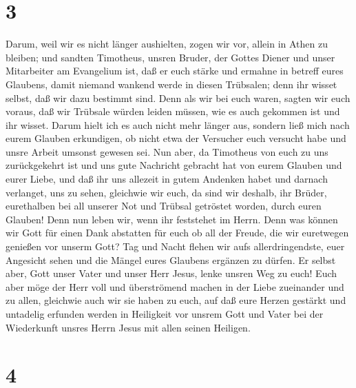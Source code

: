 \hypertarget{section-2}{%
\section{3}\label{section-2}}

 Darum, weil wir es nicht länger aushielten, zogen wir
vor, allein in Athen zu bleiben;  und sandten Timotheus,
unsren Bruder, der Gottes Diener und unser Mitarbeiter am Evangelium
ist, daß er euch stärke und ermahne in betreff eures Glaubens,
 damit niemand wankend werde in diesen Trübsalen; denn ihr
wisset selbst, daß wir dazu bestimmt sind.  Denn als wir
bei euch waren, sagten wir euch voraus, daß wir Trübsale würden leiden
müssen, wie es auch gekommen ist und ihr wisset.  Darum
hielt ich es auch nicht mehr länger aus, sondern ließ mich nach eurem
Glauben erkundigen, ob nicht etwa der Versucher euch versucht habe und
unsre Arbeit umsonst gewesen sei.  Nun aber, da Timotheus
von euch zu uns zurückgekehrt ist und uns gute Nachricht gebracht hat
von eurem Glauben und eurer Liebe, und daß ihr uns allezeit in gutem
Andenken habet und darnach verlanget, uns zu sehen, gleichwie wir euch,
 da sind wir deshalb, ihr Brüder, eurethalben bei all
unserer Not und Trübsal getröstet worden, durch euren Glauben!
 Denn nun leben wir, wenn ihr feststehet im Herrn.
 Denn was können wir Gott für einen Dank abstatten für
euch ob all der Freude, die wir euretwegen genießen vor unserm Gott?
 Tag und Nacht flehen wir aufs allerdringendste, euer
Angesicht sehen und die Mängel eures Glaubens ergänzen zu dürfen.
 Er selbst aber, Gott unser Vater und unser Herr Jesus,
lenke unsren Weg zu euch!  Euch aber möge der Herr voll
und überströmend machen in der Liebe zueinander und zu allen, gleichwie
auch wir sie haben zu euch,  auf daß eure Herzen gestärkt
und untadelig erfunden werden in Heiligkeit vor unsrem Gott und Vater
bei der Wiederkunft unsres Herrn Jesus mit allen seinen Heiligen.

\hypertarget{section-3}{%
\section{4}\label{section-3}}

